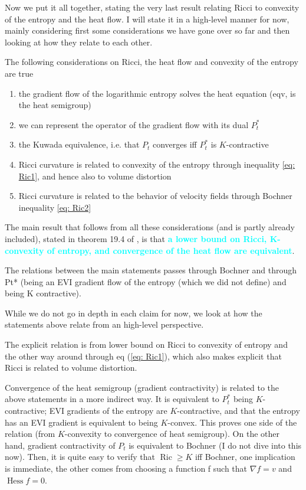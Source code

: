 \documentclass[a4paper,12pt,reqno]{amsbook}
\theoremstyle{definition} %
\newcommand{\1}{\mathbbm{1}}
\DeclareMathOperator{\Ric}{Ric}
\def\Hess{\mathop{\mathrm{Hess}}\nolimits}
\def\Ric{\mathop{\mathrm{Ric}}\nolimits}
\theoremstyle{plain}
\theoremstyle{remark}
\begin{document}
{Now we put it all together, stating the very last result relating Ricci to convexity of the entropy and the heat flow. I will state it in a high-level manner for now, mainly considering first some considerations we have gone over so far and then looking at how they relate to each other. 

The following considerations on Ricci, the heat flow and convexity of the entropy are true%
\begin{enumerate}[label=($\roman*$)]
    \item the gradient flow of the logarithmic entropy solves the heat equation (eqv, is the heat semigroup)
    \item we can represent the operator of the gradient flow with its dual $P_t^*$
    \item the Kuwada equivalence, i.e. that $P_t$ converges iff $P_t^*$ is $K$-contractive
    \item Ricci curvature is related to convexity of the entropy through inequality \ref{eq: Ric1}, and hence also to volume distortion
    \item Ricci curvature is related to the behavior of velocity fields through Bochner inequality \ref{eq: Ric2}
\end{enumerate}


The main result that follows from all these considerations (and is partly already included), stated in theorem 19.4 of \cite{brue}, is that \textbf{\textcolor{cyan}{a lower bound on Ricci, K-convexity of entropy, and convergence of the heat flow are equivalent}}. 

The relations between the main statements passes through Bochner and through Pt* (being an EVI gradient flow of the entropy (which we did not define) and being K contractive). 

While we do not go in depth in each claim for now, we look at how the statements above relate from an high-level perspective.

The explicit relation is from lower bound on Ricci to convexity of entropy and the other way around through eq (\ref{eq: Ric1}), which also makes explicit that Ricci is related to volume distortion. 

Convergence of the heat semigroup (gradient contractivity) is related to the above statements in a more indirect way. It is equivalent to $P_t^*$ being $K$-contractive; EVI gradients of the entropy are $K$-contractive, and that the entropy has an EVI gradient is equivalent to being $K$-convex. This proves one side of the relation (from $K$-convexity to convergence of heat semigroup). On the other hand, gradient contractivity of $P_t$ is equivalent to Bochner (I do not dive into this now). Then, it is quite easy to verify that $\Ric\ge K$ iff Bochner, one implication is immediate, the other comes from choosing a function f such that $\nabla f = v$ and $\Hess f =0$. 

}
\end{document}
